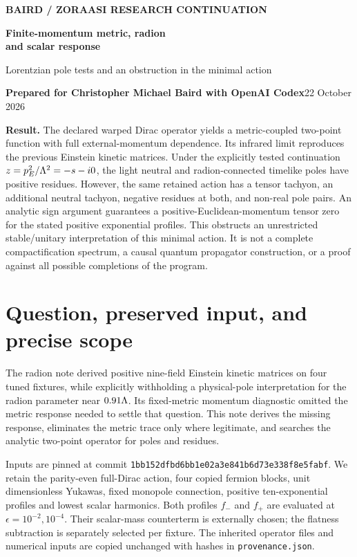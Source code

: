 \documentclass[11pt,letterpaper]{article}
\begin{document}
\thispagestyle{plain}
{\small\bfseries\color{teal} BAIRD / ZORAASI RESEARCH CONTINUATION}\par
{\LARGE\bfseries\color{navy} Finite-momentum metric, radion\\ and scalar response}\par
{\large Lorentzian pole tests and an obstruction in the minimal action}\par
\textbf{Prepared for Christopher Michael Baird with OpenAI Codex}\hfill 22 October 2026

\colorbox{pale}{\parbox{\dimexpr\linewidth-2\fboxsep\relax}{\textbf{Result.} The declared warped Dirac operator yields a metric-coupled two-point function with full external-momentum dependence. Its infrared limit reproduces the previous Einstein kinetic matrices. Under the explicitly tested continuation $z=p_E^2/\Lambda^2=-s-i0$, the light neutral and radion-connected timelike poles have positive residues. However, the same retained action has a tensor tachyon, an additional neutral tachyon, negative residues at both, and non-real pole pairs. An analytic sign argument guarantees a positive-Euclidean-momentum tensor zero for the stated positive exponential profiles. This obstructs an unrestricted stable/unitary interpretation of this minimal action. It is not a complete compactification spectrum, a causal quantum propagator construction, or a proof against all possible completions of the program.}}

\section{Question, preserved input, and precise scope}

The radion note \cite{previous} derived positive nine-field Einstein kinetic matrices on four tuned fixtures, while explicitly withholding a physical-pole interpretation for the radion parameter near $0.91\Lambda$. Its fixed-metric momentum diagnostic omitted the metric response needed to settle that question. This note derives the missing response, eliminates the metric trace only where legitimate, and searches the analytic two-point operator for poles and residues.

Inputs are pinned at commit \texttt{1bb152dfbd6bb1e02a3e841b6d73e338f8e5fabf}. We retain the parity-even full-Dirac action, four copied fermion blocks, unit dimensionless Yukawas, fixed monopole connection, positive ten-exponential profiles and lowest scalar harmonics. Both profiles $f_-$ and $f_+$ are evaluated at $\epsilon=10^{-2},10^{-4}$. Their scalar-mass counterterm is externally chosen; the flatness subtraction is separately selected per fixture. The inherited operator files and numerical inputs are copied unchanged with hashes in \texttt{provenance.json}.
\end{document}
